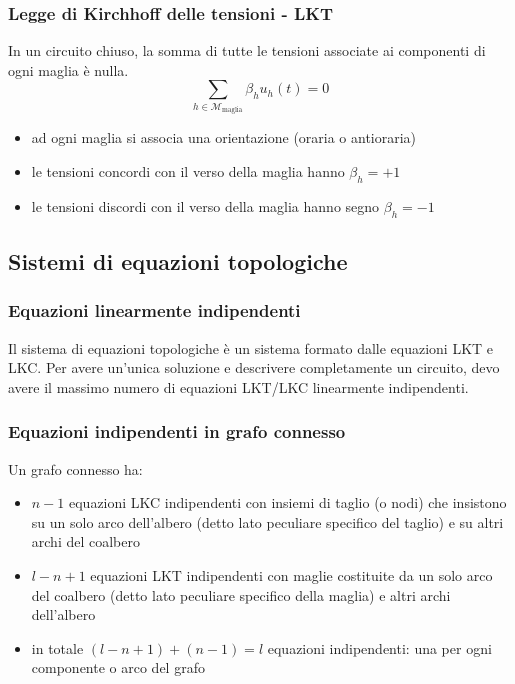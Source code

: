 \documentclass[a4paper]{article}
\begin{document}
\subsubsection*{Legge di Kirchhoff delle tensioni - LKT}
In un circuito chiuso, la somma di tutte le tensioni associate ai componenti di ogni maglia è nulla.
\[\sum_{h \in \mathcal{M}_\text{maglia}} \beta_h u_h(t) = 0\]
\begin{itemize}
	\item ad ogni maglia si associa una orientazione (oraria o antioraria)
	\item le tensioni concordi con il verso della maglia hanno \(\beta_h = +1\)
	\item le tensioni discordi con il verso della maglia hanno segno \(\beta_h = -1\)
\end{itemize}

\newpage

\subsection{Sistemi di equazioni topologiche}
\subsubsection*{Equazioni linearmente indipendenti}
Il sistema di equazioni topologiche è un sistema formato dalle equazioni LKT e LKC. Per avere un'unica soluzione e descrivere
completamente un circuito, devo avere il massimo numero di equazioni LKT/LKC linearmente indipendenti.

\subsubsection*{Equazioni indipendenti in grafo connesso}
Un grafo connesso ha:
\begin{itemize}
	\item \(n-1\) equazioni LKC indipendenti con insiemi di taglio (o nodi) che insistono su un solo arco dell'albero (detto lato
	peculiare specifico del taglio) e su altri archi del coalbero
	\item \(l-n+1\) equazioni LKT indipendenti con maglie costituite da un solo arco del coalbero (detto lato peculiare specifico
	della maglia) e altri archi dell'albero
	\item in totale \((l-n+1)+(n-1) = l\) equazioni indipendenti: una per ogni componente o arco del grafo
\end{itemize}
\end{document}
